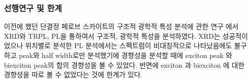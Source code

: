 \subsubsection{선행연구 및 한계}
이전에 했던 단결정 페로브 스카이트의 구조적 광학적 특성 분석에 관한 연구 에서 XRD와 TRPL, PL을 통하여서 구조적, 광학적 특성을 분석하였다. XRD는 성공적이었으나 위치별로 분석한 PL 분석에서는 스펙트럼이 비대칭적으로 나타났음에도 불구하고 peak와 half width로만 분석했기에 경향성을 분석할 때에 exciton peak 와 biexciton peak의 합의 경향성을 볼 수 있었다. 반면에 exciton 과 biexciton 에 대한 경향성을 따로 볼 수 없었다는 것에 한계가 있다.
